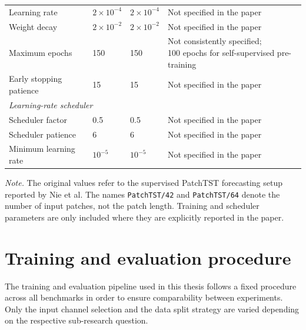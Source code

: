 \begin{table}[htbp]
\begin{tabular}{llll}
        Learning rate & $2 \times 10^{-4}$ & $2 \times 10^{-4}$ & Not specified in the paper \\
        Weight decay & $2 \times 10^{-2}$ & $2 \times 10^{-2}$ & Not specified in the paper \\
        Maximum epochs & 150 & 150 & \makecell[l]{Not consistently specified;\\100 epochs for self-supervised pre-training} \\
        Early stopping patience & 15 & 15 & Not specified in the paper \\
        \midrule
        \multicolumn{4}{l}{\textit{Learning-rate scheduler}} \\
        Scheduler factor & 0.5 & 0.5 & Not specified in the paper \\
        Scheduler patience & 6 & 6 & Not specified in the paper \\
        Minimum learning rate & $10^{-5}$ & $10^{-5}$ & Not specified in the paper \\
        \bottomrule
    \end{tabular}

    \vspace{0.2cm}
    \begin{minipage}{0.95\linewidth}
        \footnotesize
        \textit{Note.} The original values refer to the supervised PatchTST forecasting setup reported by Nie et al. The names \texttt{PatchTST/42} and \texttt{PatchTST/64} denote the number of input patches, not the patch length. Training and scheduler parameters are only included where they are explicitly reported in the paper.
    \end{minipage}
\end{table}





\newpage








\section{Training and evaluation procedure}\label{sec:train_eval}
The training and evaluation pipeline used in this thesis follows a fixed procedure across all benchmarks in order to ensure comparability between experiments. Only the input channel selection and the data split strategy are varied depending on the respective sub-research question.

